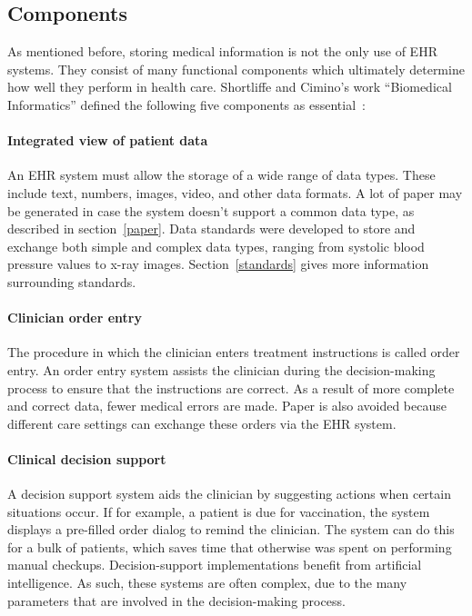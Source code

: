     \subsection{Components}\label{components}

    As mentioned before, storing medical information is not the only use of EHR systems. They consist of many functional components which ultimately determine how well they perform in health care. Shortliffe and Cimino's work ``Biomedical Informatics'' defined the following five components as essential~\cite{Shortliffe2014}:\@\paragraph{Integrated view of patient data} An EHR system must allow the storage of a wide range of data types. These include text, numbers, images, video, and other data formats. A lot of paper may be generated in case the system doesn't support a common data type, as described in section~\ref{paper}. Data standards were developed to store and exchange both simple and complex data types, ranging from systolic blood pressure values to x-ray images. Section~\ref{standards} gives more information surrounding standards.

    \paragraph{Clinician order entry} The procedure in which the clinician enters treatment instructions is called order entry. An order entry system assists the clinician during the decision-making process to ensure that the instructions are correct. As a result of more complete and correct data, fewer medical errors are made. Paper is also avoided because different care settings can exchange these orders via the EHR system.

    \paragraph{Clinical decision support} A decision support system aids the clinician by suggesting actions when certain situations occur. If for example, a patient is due for vaccination, the system displays a pre-filled order dialog to remind the clinician. The system can do this for a bulk of patients, which saves time that otherwise was spent on performing manual checkups. Decision-support implementations benefit from artificial intelligence. As such, these systems are often complex, due to the many parameters that are involved in the decision-making process.

